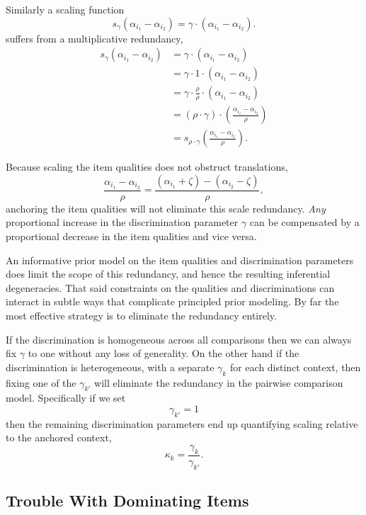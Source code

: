 \documentclass[
  letterpaper,
  DIV=11,
  numbers=noendperiod]{scrartcl}
\begin{document}
Similarly a scaling function \[
s_{\gamma} (\alpha_{i_{1}} - \alpha_{i_{2}} )
=
\gamma \cdot (\alpha_{i_{1}} - \alpha_{i_{2}}).
\] suffers from a multiplicative redundancy, \begin{align*}
s_{\gamma} (\alpha_{i_{1}} - \alpha_{i_{2}} )
&=
\gamma \cdot (\alpha_{i_{1}} - \alpha_{i_{2}})
\\
&=
\gamma \cdot 1 \cdot (\alpha_{i_{1}} - \alpha_{i_{2}})
\\
&=
\gamma \cdot \frac{\rho}{\rho} \cdot (\alpha_{i_{1}} - \alpha_{i_{2}})
\\
&=
(\rho \cdot \gamma) \cdot
\left( \frac{\alpha_{i_{1}} - \alpha_{i_{2}}}{\rho} \right)
\\
&=
s_{\rho \cdot \gamma}
\left( \frac{\alpha_{i_{1}} - \alpha_{i_{2}}}{\rho} \right).
\end{align*}

Because scaling the item qualities does not obstruct translations, \[
\frac{\alpha_{i_{1}} - \alpha_{i_{2}}}{\rho}
=
\frac{ (\alpha_{i_{1}} + \zeta) - (\alpha_{i_{2}} - \zeta)}{\rho},
\] anchoring the item qualities will not eliminate this scale
redundancy. \emph{Any} proportional increase in the discrimination
parameter \(\gamma\) can be compensated by a proportional decrease in
the item qualities and vice versa.

An informative prior model on the item qualities and discrimination
parameters does limit the scope of this redundancy, and hence the
resulting inferential degeneracies. That said constraints on the
qualities and discriminations can interact in subtle ways that
complicate principled prior modeling. By far the most effective strategy
is to eliminate the redundancy entirely.

If the discrimination is homogeneous across all comparisons then we can
always fix \(\gamma\) to one without any loss of generality. On the
other hand if the discrimination is heterogeneous, with a separate
\(\gamma_{k}\) for each distinct context, then fixing one of the
\(\gamma_{k'}\) will eliminate the redundancy in the pairwise comparison
model. Specifically if we set \[
\gamma_{k'} = 1
\] then the remaining discrimination parameters end up quantifying
scaling relative to the anchored context, \[
\kappa_{k} = \frac{ \gamma_{k} }{ \gamma_{k'} }.
\]

\subsection{Trouble With Dominating
Items}\label{trouble-with-dominating-items}
\end{document}
